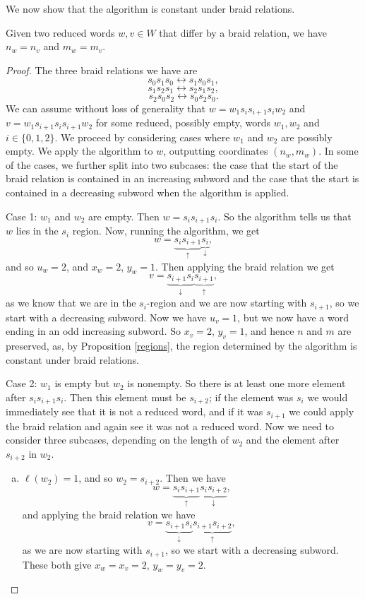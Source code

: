 \documentclass[11pt]{article}
\begin{document}
We now show that the algorithm is constant under braid relations. 

\begin{proposition} \label{regionslemma}
    Given two reduced words $w,v\in W$ that differ by a braid relation, we have $n_w=n_v$ and $m_w=m_v$. 
\end{proposition}

\begin{proof}
    The three braid relations we have are 
    \[s_0s_1s_0\longleftrightarrow s_1s_0s_1,\]
    \[s_1s_2s_1\longleftrightarrow s_2s_1s_2,\]
    \[s_2s_0s_2\longleftrightarrow s_0s_2s_0.\]
    We can assume without loss of generality that $w=w_1s_is_{i+1}s_iw_2$ and $v=w_1s_{i+1}s_is_{i+1}w_2$ for some reduced, possibly empty, words $w_1, w_2$ and $i\in \{0,1,2\}$. We proceed by considering cases where $w_1$ and $w_2$ are possibly empty. We apply the algorithm to $w$, outputting coordinates $(n_w,m_w)$. In some of the cases, we further split into two subcases:  the case that the start of the braid relation is contained in an increasing subword and the case that the start is contained in a decreasing subword when the algorithm is applied.
    
    Case 1: $w_1$ and $w_2$ are empty. Then $w=s_is_{i+1}s_i$. So the algorithm tells us that $w$ lies in the $s_i$ region. Now, running the algorithm, we get 
        \[w=\underbrace{s_is_{i+1}}_\uparrow \underbrace{s_i}_\downarrow,\]
        and so $u_w=2$, and $x_w=2$, $y_w=1$. Then applying the braid relation we get 
        \[v=\underbrace{s_{i+1}s_i}_\downarrow \underbrace{s_{i+1}}_\uparrow,\]
        as we know that we are in the $s_i$-region  and we are now starting with $s_{i+1}$, so we start with a decreasing subword. Now we have $u_v=1$, but we now have a word ending in an odd increasing subword. So $x_v=2$, $y_v=1$, and hence $n$ and $m$ are preserved, as, by Proposition \ref{regions}, the region determined by the algorithm is constant under braid relations.

    Case 2: $w_1$ is empty but $w_2$ is nonempty. 
    So there is at least one more element after $s_is_{i+1}s_i$. Then this element must be $s_{i+2}$; if the element was $s_i$ we would immediately see that it is not a reduced word, and if it was $s_{i+1}$ we could apply the braid relation and again see it was not a reduced word. Now we need to consider three subcases, depending on the length of $w_2$ and the element after $s_{i+2}$ in $w_2$.

    \begin{enumerate}[(a)]
        \item $\ell(w_2)=1$, and so $w_2=s_{i+2}$. Then we have
        \[w=\underbrace{s_is_{i+1}}_\uparrow \underbrace{s_is_{i+2}}_\downarrow,\]
        and applying the braid relation we have
        \[v=\underbrace{s_{i+1}s_i}_\downarrow \underbrace{s_{i+1}s_{i+2}}_\uparrow,\]
        as we are now starting with $s_{i+1}$, so we start with a decreasing subword. These both give $x_w=x_v=2$, $y_w=y_v=2$. 
        

\end{enumerate}
\end{proof}
\end{document}

